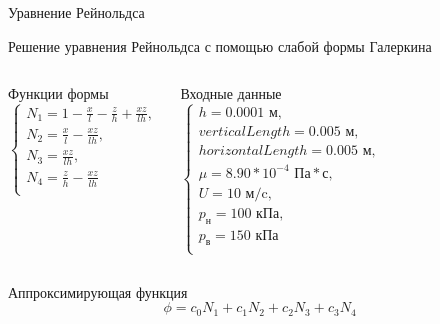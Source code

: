 \documentclass[ignoreonframetext,unicode]{beamer}
\begin{document}
\begin{frame}{Уравнение Рейнольдса}
	\end{frame}	

\begin{frame}{Решение уравнения Рейнольдса с помощью слабой формы Галеркина}
	
\begin{columns}
		
	\begin{block}{Функции формы}
		\[
			\begin{cases}
				N_1 = 1 - \frac{x}{l} - \frac{z}{h} + \frac{x  z}{l  h}, \\
				N_2 = \frac{x}{l} - \frac{x  z}{l  h}, \\
				N_3 = \frac{x  z}{l h}, \\
				N_4 = \frac{z}{h} - \frac{x  z}{l  h} \\
			\end{cases}
			\label{form-func}
		\]
		\end{block}
	
	\begin{block}{Входные данные}
	\[
		\begin{cases}
			h = 0.0001 \text{ м}, \\
			verticalLength = 0.005 \text{ м}, \\
			horizontalLength = 0.005 \text{ м}, \\
			\mu = 8.90 * 10^{-4} \text{ Па}*\text{с}, \\
			U = 10 \text{ м/c}, \\
			p_{\text{н}} = 100 \text{ кПа}, \\
			p_{\text{в}} = 150 \text{ кПа} \\
		\end{cases}	
	\]
\end{block}
\end{columns}

\begin{block}{Аппроксимирующая функция}
	\[
	\phi = c_0 N_1 + c_1 N_2 + c_2 N_3 + c_3 N_4
	\]
\end{block}
	
\end{frame}
\end{document}
